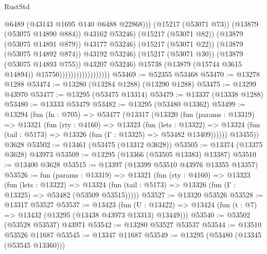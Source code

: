 \begin{lexlean}{RustStd}
\begin{coremodule}
                                                    @6489
                                                    (@43143 @1695 @140 @6488 @22868)))
                                                (@15217 (@53071 @73))
                                                (@13879 (@53075 @14890 @884))
                                                @43162
                                                @53246)
                                              (@15217 (@53071 @82))
                                              (@13879 (@53075 @14891 @879))
                                              @43177
                                              @53246)
                                            (@15217 (@53071 @22))
                                            (@13879 (@53075 @14892 @874))
                                            @43192
                                            @53246)
                                          (@15217 (@53071 @30))
                                          (@13879 (@53075 @14893 @755))
                                          @43207
                                          @53246)
                                        @15738
                                        (@13879 (@15744 @3615 @14894))
                                        @15750))))))))))))))))))
@53469 := @52355 @53468
@53470 := @13278 @1288
@53474 := @13280 (@13284 @1288) (@13290 @1288)
@53475 := @13299 @43970
@53477 := @13295 (@53475 @13314)
@53479 := @13337 (@13338 @1288)
@53480 := @13333 @53479
@53482 := @13295 (@53480 @13362)
@53499 := @13294
    (fun (fn : @705) =>
    @53477
      (@13317
        (@13320
          (fun (params : @13319) =>
          @13321
            (fun (rty : @4160) =>
            @13323
              (fun (lets : @13322) =>
              @13324 (fun (tail : @5173) => @13326 (fun (Γ : @13325) => @53482 @13409))))))
        @13455))
    @3628
@53502 := @13461 (@53475 (@13312 @3628))
@53505 := @13374 (@13375 @3628) @43973
@53509 := @13295 (@13366 (@53505 @13383) @13387)
@53510 := @13400 @3628
@53515 := @13397 (@13399 @53510 @43976 @13355 @13357)
@53526 := fun (params : @13319) =>
  @13321
    (fun (rty : @4160) =>
    @13323
      (fun (lets : @13322) =>
      @13324 (fun (tail : @5173) => @13326 (fun (Γ : @13325) => @53482 (@53509 @53515)))))
@53527 := @13320 @53526
@53528 := @13317 @53527
@53537 := @13423
    (fun (U : @13422) => @13424 (fun (t : @7) => @13432 (@13295 (@13438 @43973 @13313) @13449)))
@53540 := @53502 (@53528 @53537) @43971
@53542 := @13280 @53527 @53537
@53544 := @13510 @53526 @11687
@53545 := @13347 @11687
@53549 := @13295 (@53480 (@13345 (@53545 @13360)))

\end{coremodule}
\end{lexlean}
